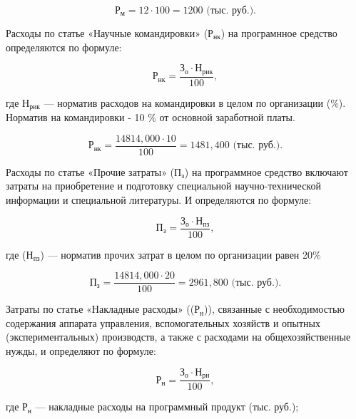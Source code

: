 \begin{displaymath}
  \text{Р}_{\text{м}} = 12 \cdot 100 = 1200 \text{ (тыс. руб.)}.
\end{displaymath}

Расходы по статье «Научные командировки» (\(\text{Р}_{\text{нк}}\)) на програмнное средство определяются по формуле:

\begin{displaymath}
  \text{Р}_{\text{нк}} = \frac{\text{З}_{\text{о}} \cdot \text{Н}_{\text{рик}}}{100},
\end{displaymath}

где \(\text{Н}_{\text{рик}}\) --- норматив расходов на командировки в целом по организации (\%). Норматив на командировки - 10 \% от основной заработной платы.

\begin{displaymath}
  \text{Р}_{\text{нк}} = \frac{14814,000 \cdot 10}{100} = 1481,400 \text{ (тыс. руб.)}.
\end{displaymath}

Расходы по статье «Прочие затраты» (\(\text{П}_{\text{з}}\)) на программное средство включают затраты на приобретение и подготовку специальной научно-технической информации и специальной литературы. И определяются по формуле:

\begin{displaymath}
  \text{П}_{\text{з}} = \frac{\text{З}_{\text{о}} \cdot \text{Н}_{\text{пз}}}{100},
\end{displaymath}

где (\(\text{Н}_{\text{пз}}\)) --- норматив прочих затрат в целом по организации равен 20\%

\begin{displaymath}
  \text{П}_{\text{з}} = \frac{14814,000 \cdot 20}{100} = 2961,800 \text{ (тыс. руб.)}.
\end{displaymath}

Затраты по статье «Накладные расходы» ((\(\text{Р}_{\text{н}}\))), связанные с необходимостью содержания аппарата управления, вспомогательных хозяйств и опытных (экспериментальных) производств, а также с расходами на общехозяйственные нужды, и определяют по формуле:

\begin{displaymath}
  \text{Р}_{\text{н}} = \frac{\text{З}_{\text{о}} \cdot \text{Н}_{\text{рн}}}{100},
\end{displaymath}

где \(\text{Р}_{\text{н}}\) --- накладные расходы на программный продукт (тыс. руб.);

